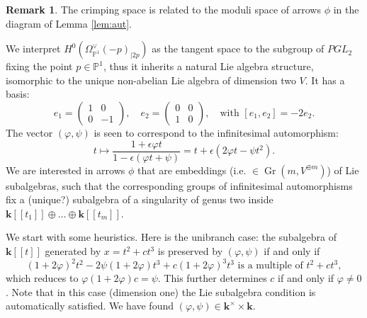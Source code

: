 \documentclass[11pt]{amsart}
\newcommand{\PP}{\mathbb P}
\renewcommand{\k}{\mathbf k}
\theoremstyle{plain}
\theoremstyle{definition}
\newtheorem{rem}[thm]{Remark}
\begin{document}
\begin{rem}
 The crimping space is related to the moduli space of arrows $\phi$ in the diagram of Lemma \ref{lem:aut}.
 
 We interpret $H^0(\Omega_{\PP^1}^\vee(-p)_{|2p})$ as the tangent space to the subgroup of $PGL_2$ fixing the point $p\in\PP^1$, thus it inherits a natural Lie algebra structure, isomorphic to the unique non-abelian Lie algebra of dimension two $V$. It has a basis: \[e_1=\begin{pmatrix} 1 & 0 \\ 0 & -1\end{pmatrix}, \quad e_2=\begin{pmatrix} 0 & 0 \\ 1 & 0\end{pmatrix},\quad \text{with } [e_1,e_2]=-2e_2.\]
 The vector $(\varphi,\psi)$ is seen to correspond to the infinitesimal automorphism: \[t\mapsto\frac{1+\epsilon\varphi t}{1-\epsilon(\varphi t+\psi)}=t+\epsilon(2\varphi t-\psi t^2).\]
 We are interested in arrows $\phi$ that are embeddings (i.e. $\in\operatorname{Gr}(m,V^{\oplus m})$) of Lie subalgebras, such that the corresponding groups of infinitesimal automorphisms fix a (unique?) subalgebra of a singularity of genus two inside $\k[\![t_1]\!]\oplus\ldots\oplus\k[\![t_m]\!]$.
 
 We start with some heuristics. Here is the unibranch case: the subalgebra of $\k[\![t]\!]$ generated by $x=t^2+ct^3$ is preserved by $(\varphi,\psi)$ if and only if
 \[(1+2\varphi)^2t^2-2\psi(1+2\varphi)t^3+c(1+2\varphi)^3t^3\text{ is a multiple of } t^2+ct^3,\]
 which reduces to $\varphi(1+2\varphi)c=\psi$. This further determines $c$ if and only if $\varphi\neq 0$. Note that in this case (dimension one) the Lie subalgebra condition is automatically satisfied. We have found $(\varphi,\psi)\in\k^\times\times\k$.
 

\end{rem}
\end{document}
